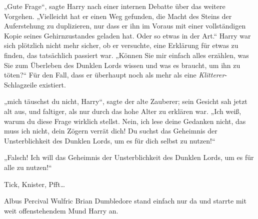 „Gute Frage“, sagte Harry nach einer internen Debatte über das weitere Vorgehen. „Vielleicht hat er einen Weg gefunden, die Macht des Steins der Auferstehung zu duplizieren, nur dass er ihn im Voraus mit einer vollständigen Kopie seines Gehirnzustandes geladen hat. Oder so etwas in der Art.“ Harry war sich plötzlich nicht mehr sicher, ob er versuchte, eine Erklärung für etwas zu finden, das tatsächlich passiert war. „Können Sie mir einfach alles erzählen, was Sie zum Überleben des Dunklen Lords wissen und was es braucht, um ihn zu töten?“ Für den Fall, dass er überhaupt noch als mehr als eine \emph{Klitterer}-Schlagzeile existiert.

„mich täuschst du nicht, Harry“, sagte der alte Zauberer; sein Gesicht sah jetzt alt aus, und faltiger, als nur durch das hohe Alter zu erklären war. „Ich weiß, warum du diese Frage wirklich stellst. Nein, ich lese deine Gedanken nicht, das muss ich nicht, dein Zögern verrät dich! Du suchst das Geheimnis der Unsterblichkeit des Dunklen Lords, um es für dich selbst zu nutzen!“

„Falsch! Ich will das Geheimnis der Unsterblichkeit des Dunklen Lords, um es für alle zu nutzen!“

\later

Tick, Knister, Pfft…

Albus Percival Wulfric Brian Dumbledore stand einfach nur da und starrte mit weit offenstehendem Mund Harry an.

